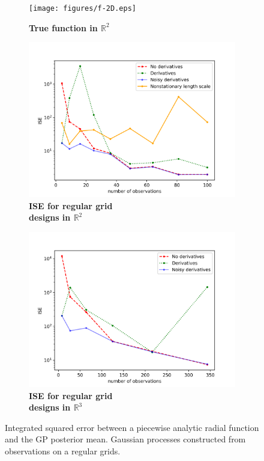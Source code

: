\documentclass{article}
\newcommand{\R}{\mathbb{R}}
\begin{document}
\begin{figure}
		\centering
		\captionsetup{justification=centering}
    \begin{subfigure}[t]{.33\textwidth}
      \centering
      \texttt{[image: figures/f-2D.eps]}
      \caption{\textbf{True function in $\R^2$}}
    \end{subfigure}%
    \begin{subfigure}[t]{.33\textwidth}
      \centering
      \includegraphics[scale=0.38]{figures/regular-2D-length.png}
      \caption{\textbf{ISE for regular grid \\ designs in $\R^2$}}
    \end{subfigure}
    \begin{subfigure}[t]{.33\textwidth}
      \centering
      \includegraphics[scale=0.38]{figures/regular-3D.png}
      \caption{\textbf{ISE for regular grid \\ designs in $\R^3$}}
    \end{subfigure}
		\caption{Integrated squared error between a piecewise analytic radial function and the GP posterior mean. Gaussian processes constructed from observations on a regular grids.}
		\label{regular-2D}
\end{figure}
\end{document}
